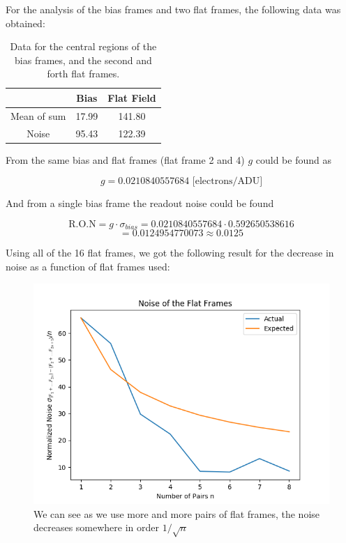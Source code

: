 \documentclass{emulateapj}
\begin{document}
For the analysis of the bias frames and two flat frames, the following data was obtained:

\begin{table}[H]
\centering
\begin{tabular}{c|c|c}
  & Bias & Flat Field \\
  \hline
Mean of sum & 17.99 & 141.80\\
Noise & 95.43 & 122.39
\end{tabular}
\caption{Data for the central regions of the bias frames, and the second and forth flat frames.}
\label{tab:biasFlat}
\end{table}


From the same bias and flat frames (flat frame 2 and 4) $g$ could be found as

\begin{equation}
g = 0.0210840557684  \text{ [electrons/ADU]}
\label{eq:gVal}
\end{equation}

And from a single bias frame the readout noise could be found

\begin{equation}
\text{R.O.N} = g\cdot\sigma_{bias} = 0.0210840557684\cdot0.592650538616 
\end{equation}
\begin{equation}
= 0.0124954770073 \approx 0.0125
\end{equation}


Using all of the 16 flat frames, we got the following result for the decrease in noise as a function of flat frames used:

\begin{figure}[H]
\centering
\includegraphics[scale=0.4]{noisePairs.png}
\caption{We can see as we use more and more pairs of flat frames, the noise decreases somewhere in order $1/\sqrt{n}$}
\label{img:noisePairs}
\end{figure}
\end{document}
